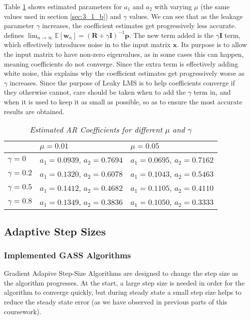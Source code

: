 \documentclass[./main.tex]{subfiles}
\begin{document}
Table \ref{tab:3_1_f} shows estimated parameters for $a_1$ and $a_2$ with varying $\mu$ (the same values used in section \ref{sec:3_1_b}) and $\gamma$ values. We can see that as the leakage parameter $\gamma$ increases, the coefficient estimates get progressively less accurate. \cite{Kamenetsky2004} defines $ \lim_{n \to \infty } \mathbb{E}[\mathbf{w}_n] = (\mathbf{R} + \gamma \mathbf{I})^{-1} \mathbf{p} $. The new term added is the $\gamma \mathbf{I} $ term, which effectively introduces noise in to the input matrix $ \mathbf{x} $. Its purpose is to allow the input matrix to have non-zero eigenvalues, as in some cases this can happen, meaning coefficients do not converge. Since the extra term is effectively adding white noise, this explains why the coefficient estimates get progressively worse as $ \gamma $ increases. Since the purpose of Leaky LMS is to help coefficients converge if they otherwise cannot, care should be taken when to add the $ \gamma $ term in, and when it is used to keep it as small as possible, so as to ensure the most accurate results are obtained.

\begin{table}[h]
\centering
\begin{tabular}{|l|l|l|}
\hline
               & $\mu = 0.01 $                  & $\mu = 0.05 $                  \\ \hline
$\gamma = 0$   & $a_1 = 0.0939$, $a_2 = 0.7694$ & $a_1 = 0.0695$, $a_2 = 0.7162$ \\ \hline
$\gamma = 0.2$ & $a_1 = 0.1320$, $a_2 = 0.6078$ & $a_1 = 0.1043$, $a_2 = 0.5463$ \\ \hline
$\gamma = 0.5$ & $a_1 = 0.1412$, $a_2 = 0.4682$ & $a_1 = 0.1105$, $a_2 = 0.4110$ \\ \hline
$\gamma = 0.8$ & $a_1 = 0.1349$, $a_2 = 0.3836$ & $a_1 = 0.1050$, $a_2 = 0.3333$ \\ \hline
\end{tabular}
\caption{\textit{Estimated AR Coefficients for different $\mu$ and $\gamma$}}
\label{tab:3_1_f}
\end{table}

\subsection{Adaptive Step Sizes}

\subsubsection{Implemented GASS Algorithms}
Gradient Adapive Step-Size Algorithms are designed to change the step size as the algorithm progresses. At the start, a large step size is needed in order for the algorithm to converge quickly, but during steady state a small step size helps to reduce the steady state error (as we have observed in previous parts of this coursework).
\end{document}
